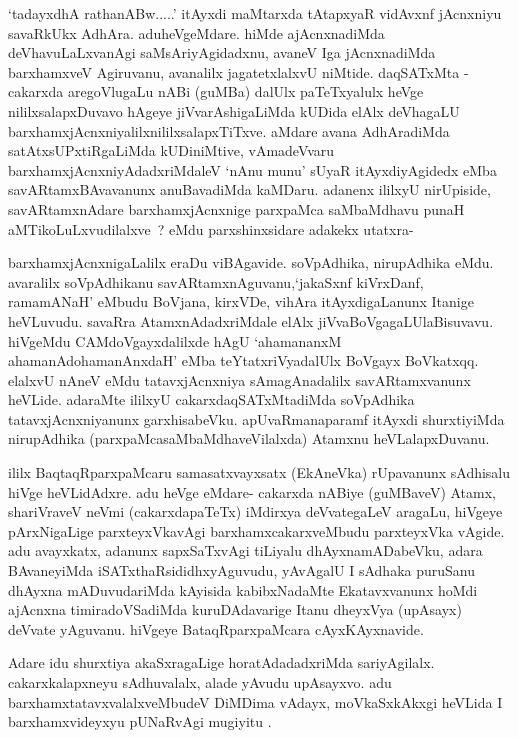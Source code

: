 \begin{artha}
`tadayxdhA rathanABw.....' itAyxdi maMtarxda tAtapxyaR vidAvxnf jAcnxniyu  savaRkUkx AdhAra. aduheVgeMdare. hiMde ajAcnxnadiMda deVhavuLaLxvanAgi saMsAriyAgidadxnu, avaneV Iga jAcnxnadiMda barxhamxveV Agiruvanu, avanalilx jagatetxlalxvU niMtide. daqSATxMta - cakarxda aregoVlugaLu nABi (guMBa) dalUlx paTeTxyalulx heVge nililxsalapxDuvavo hAgeye jiVvarAshigaLiMda kUDida elAlx deVhagaLU barxhamxjAcnxniyalilxnililxsalapxTiTxve. aMdare avana AdhAradiMda satAtxsUPxtiRgaLiMda kUDiniMtive, vAmadeVvaru barxhamxjAcnxniyAdadxriMdaleV `nAnu munu' sUyaR itAyxdiyAgidedx eMba savARtamxBAvavanunx anuBavadiMda kaMDaru. adanenx ililxyU nirUpiside, savARtamxnAdare barxhamxjAcnxnige parxpaMca saMbaMdhavu punaH aMTikoLuLxvudilalxve~? eMdu parxshinxsidare adakekx utatxra- 

barxhamxjAcnxnigaLalilx eraDu viBAgavide. soVpAdhika, nirupAdhika eMdu. avaralilx soVpAdhikanu savARtamxnAguvanu,`jakaSxnf kiVrxDanf, ramamANaH' eMbudu BoVjana, kirxVDe, vihAra itAyxdigaLanunx Itanige heVLuvudu. savaRra AtamxnAdadxriMdale elAlx jiVvaBoVgagaLUlaBisuvavu. hiVgeMdu CAMdoVgayxdalilxde hAgU `ahamananxM ahamanAdo\s hamanAnxdaH' eMba teYtatxriVyadalUlx BoVgayx BoVkatxqq. elalxvU nAneV eMdu tatavxjAcnxniya sAmagAnadalilx savARtamxvanunx heVLide. adaraMte ililxyU cakarxdaqSATxMtadiMda soVpAdhika tatavxjAcnxniyanunx garxhisabeVku. apUvaRmanaparamf itAyxdi shurxtiyiMda nirupAdhika (parxpaMcasaMbaMdhaveVilalxda) Atamxnu heVLalapxDuvanu.
\end{artha}

\centerline{}

\begin{artha}
ililx BaqtaqRparxpaMcaru samasatxvayxsatx (EkAneVka) rUpavanunx sAdhisalu hiVge heVLidAdxre. adu heVge eMdare- cakarxda nABiye (guMBaveV) Atamx, shariVraveV neVmi (cakarxdapaTeTx) iMdirxya deVvategaLeV aragaLu, hiVgeye pArxNigaLige parxteyxVkavAgi barxhamxcakarxveMbudu parxteyxVka vAgide. adu avayxkatx, adanunx sapxSaTxvAgi tiLiyalu dhAyxnamADabeVku, adara BAvaneyiMda iSATxthaRsididhxyAguvudu, yAvAgalU I sAdhaka puruSanu dhAyxna mADuvudariMda kAyisida kabibxNadaMte Ekatavxvanunx hoMdi ajAcnxna timiradoVSadiMda kuruDAdavarige Itanu dheyxVya (upAsayx) deVvate  yAguvanu. hiVgeye BataqRparxpaMcara cAyxKAyxnavide.
\end{artha}

\centerline{}

\begin{artha}
Adare idu shurxtiya akaSxragaLige horatAdadadxriMda sariyAgilalx. cakarxkalapxneyu  sAdhuvalalx, alade yAvudu upAsayxvo. adu barxhamxtatavxvalalxveMbudeV DiMDima	vAdayx,  moVkaSxkAkxgi heVLida I barxhamxvideyxyu pUNaRvAgi mugiyitu .
\end{artha}


